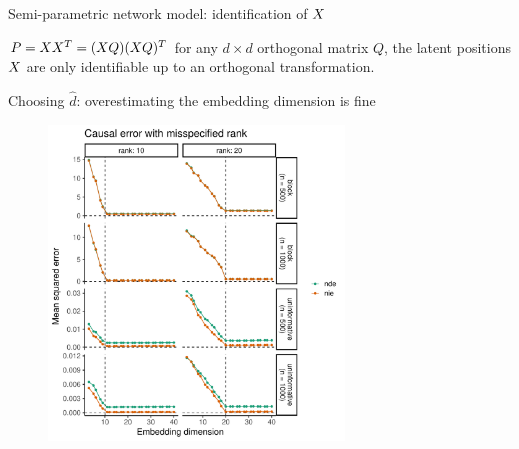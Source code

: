 \documentclass[aspectratio=169]{beamer}
\theoremstyle{remark}
\begin{document}
\begin{frame}{Semi-parametric network model: identification of $X$}

    $P = X X^T = (X Q) (X Q)^T$ for any $d \times d$ orthogonal matrix $Q$, the latent positions $X$ are only identifiable up to an orthogonal transformation.
\end{frame}

\begin{frame}{Choosing $\widehat{d}$: overestimating the embedding dimension is fine}

    \centering

    \begin{figure}
        \includegraphics[width=0.7\textwidth]{figures/misspecification/loss_average.pdf}
    \end{figure}

\end{frame}
\end{document}
